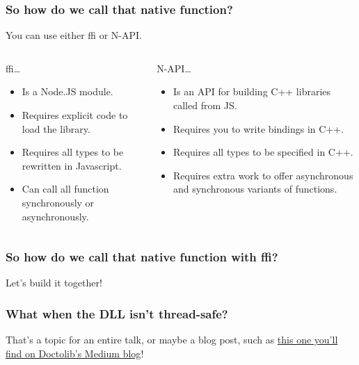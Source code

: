 \begin{frame}
	\frametitle{So how do we call that native function?}

	You can use either ffi or N-API. \vspace{1em}

	\begin{columns}[t]
		\begin{column}{0.5\textwidth}
			ffi…
			\begin{itemize}
				\item Is a Node.JS module.
				\item Requires explicit code to load the library.
				\item Requires all types to be rewritten in Javascript.
				\item Can call all function synchronously or asynchronously.
			\end{itemize}
		\end{column}
		\begin{column}{0.5\textwidth}
			N-API…
			\begin{itemize}
				\item Is an API for building C++ libraries called from JS.
				\item Requires you to write bindings in C++.
				\item Requires all types to be specified in C++.
				\item Requires extra work to offer asynchronous and synchronous
					variants of functions.
			\end{itemize}
		\end{column}
	\end{columns}
\end{frame}

\begin{frame}
	\frametitle{So how do we call that native function with ffi?}

	\centering
	\LARGE
	Let’s build it together!
\end{frame}

\begin{frame}
	\frametitle{What when the DLL isn’t thread-safe?}

	\Large
	That’s a topic for an entire talk, or maybe a blog post, such as \href{https://medium.com/doctolib/calling-into-thread-unsafe-dlls-with-node-ffi-1ef83806a50c}{this one you’ll find on Doctolib’s Medium blog}!
\end{frame}

